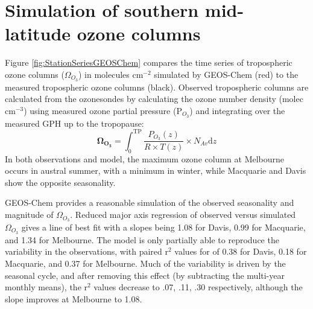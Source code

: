 \section{Simulation of southern mid-latitude ozone columns}
  
  Figure \ref{fig:StationSeriesGEOSChem} compares the time series of tropospheric ozone columns ($\Omega_{O_3}$) in molecules cm$^{-2}$ simulated by GEOS-Chem (red) to the measured tropospheric ozone columns (black).
  Observed tropospheric columns are calculated from the ozonesondes by calculating the ozone number density (molec cm$^{-3}$) using measured ozone partial pressure (P$_{O_3}$) and integrating over the measured GPH up to the tropopause:
  \begin{equation*}
    \mathbf{\Omega_{O_3}} = \int_{0}^{\text{TP}} \frac{P_{O_3}(z)}{R \times T(z)} \times N_{Av} \text{d}z
  \end{equation*}
  In both observations and model, the maximum ozone column at Melbourne occurs in austral summer, with a minimum in winter, while Macquarie and Davis show the opposite seasonality.
  
  \begin{figure*}[t]
    \caption{Comparison between observed (black) and simulated (pink, red) tropospheric ozone columns ($\Omega_{O3}$, in molecules cm$^{-2}$) from 1 January 2004 to 30 April 2013.
    For the model, daily output is shown in pink, while output from days with ozonesonde measurements are shown in red.
    For each site, the model has been sampled in the relevant grid square.}
    \label{fig:StationSeriesGEOSChem}
  \end{figure*}
  
  GEOS-Chem provides a reasonable simulation of the observed seasonality and magnitude of $\Omega_{O_3}$. 
  Reduced major axis regression of observed versus simulated $\Omega_{O_3}$ gives a line of best fit with a slopes being 1.08 for Davis, 0.99 for Macquarie, and 1.34 for Melbourne.
  The model is only partially able to reproduce the variability in the observations, with paired r$^2$ values for of 0.38 for Davis, 0.18 for Macquarie, and 0.37 for Melbourne.
  Much of the variability is driven by the seasonal cycle, and after removing this effect (by subtracting the multi-year monthly means), the r$^2$ values decrease to .07, .11, .30 respectively, although the slope improves at Melbourne to 1.08.
  

